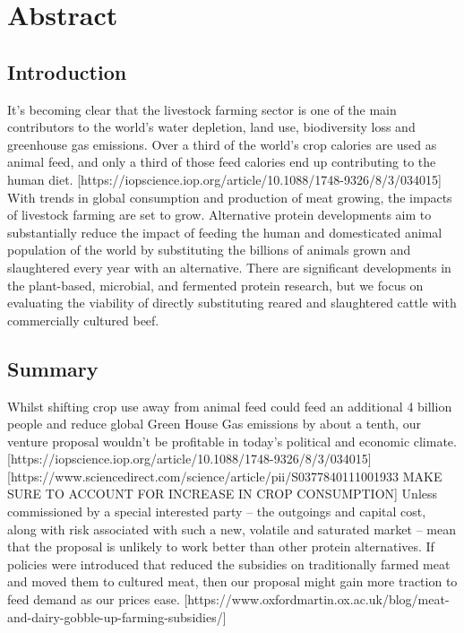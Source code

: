 \newpage
\section{Abstract}

\subsection*{Introduction}

It’s becoming clear that the livestock farming sector is one of the main contributors to the world’s water depletion, land use, biodiversity loss and greenhouse gas emissions. Over a third of the world’s crop calories are used as animal feed, and only a third of those feed calories end up contributing to the human diet. [https://iopscience.iop.org/article/10.1088/1748-9326/8/3/034015] With trends in global consumption and production of meat growing, the impacts of livestock farming are set to grow.
Alternative protein developments aim to substantially reduce the impact of feeding the human and domesticated animal population of the world by substituting the billions of animals grown and slaughtered every year with an alternative. There are significant developments in the plant-based, microbial, and fermented protein research, but we focus on evaluating the viability of directly substituting reared and slaughtered cattle with commercially cultured beef. 


\subsection*{Summary}

Whilst shifting crop use away from animal feed could feed an additional 4 billion people and reduce global Green House Gas emissions by about a tenth, our venture proposal wouldn’t be profitable in today’s political and economic climate. [https://iopscience.iop.org/article/10.1088/1748-9326/8/3/034015] [https://www.sciencedirect.com/science/article/pii/S0377840111001933 MAKE SURE TO ACCOUNT FOR INCREASE IN CROP CONSUMPTION]
Unless commissioned by a special interested party – the outgoings and capital cost, along with risk associated with such a new, volatile and saturated market – mean that the proposal is unlikely to work better than other protein alternatives. If policies were introduced that reduced the subsidies on traditionally farmed meat and moved them to cultured meat, then our proposal might gain more traction to feed demand as our prices ease. [https://www.oxfordmartin.ox.ac.uk/blog/meat-and-dairy-gobble-up-farming-subsidies/]

